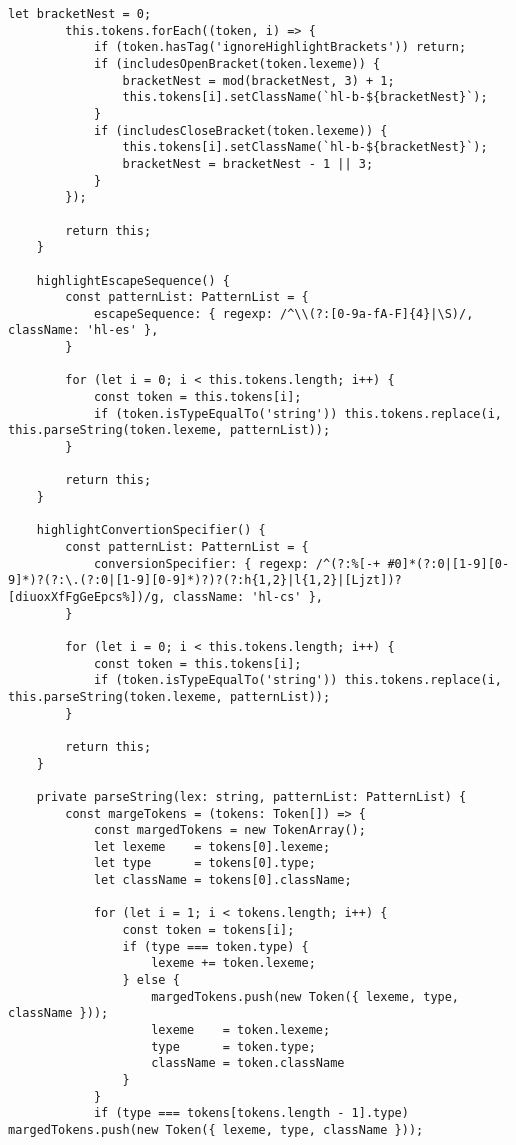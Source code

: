 \documentclass[autodetect-engine,dvi=dvipdfmx,ja=standard,
               a4j,11pt]{bxjsarticle}
\begin{document}
\begin{lstlisting}[caption={ハイライタ基底クラス({\tt base.ts})}, label={prog:base}]
        let bracketNest = 0;
        this.tokens.forEach((token, i) => {
            if (token.hasTag('ignoreHighlightBrackets')) return;
            if (includesOpenBracket(token.lexeme)) {
                bracketNest = mod(bracketNest, 3) + 1;
                this.tokens[i].setClassName(`hl-b-${bracketNest}`);
            }
            if (includesCloseBracket(token.lexeme)) {
                this.tokens[i].setClassName(`hl-b-${bracketNest}`);
                bracketNest = bracketNest - 1 || 3;
            }
        });

        return this;
    }

    highlightEscapeSequence() {
        const patternList: PatternList = {
            escapeSequence: { regexp: /^\\(?:[0-9a-fA-F]{4}|\S)/, className: 'hl-es' },
        }

        for (let i = 0; i < this.tokens.length; i++) {
            const token = this.tokens[i];
            if (token.isTypeEqualTo('string')) this.tokens.replace(i, this.parseString(token.lexeme, patternList));
        }

        return this;
    }

    highlightConvertionSpecifier() {
        const patternList: PatternList = {
            conversionSpecifier: { regexp: /^(?:%[-+ #0]*(?:0|[1-9][0-9]*)?(?:\.(?:0|[1-9][0-9]*)?)?(?:h{1,2}|l{1,2}|[Ljzt])?[diuoxXfFgGeEpcs%])/g, className: 'hl-cs' },
        }

        for (let i = 0; i < this.tokens.length; i++) {
            const token = this.tokens[i];
            if (token.isTypeEqualTo('string')) this.tokens.replace(i, this.parseString(token.lexeme, patternList));
        }

        return this;
    }

    private parseString(lex: string, patternList: PatternList) {
        const margeTokens = (tokens: Token[]) => {
            const margedTokens = new TokenArray();
            let lexeme    = tokens[0].lexeme;
            let type      = tokens[0].type;
            let className = tokens[0].className;

            for (let i = 1; i < tokens.length; i++) {
                const token = tokens[i];
                if (type === token.type) {
                    lexeme += token.lexeme;
                } else {
                    margedTokens.push(new Token({ lexeme, type, className }));
                    lexeme    = token.lexeme;
                    type      = token.type;
                    className = token.className
                }
            }
            if (type === tokens[tokens.length - 1].type) margedTokens.push(new Token({ lexeme, type, className }));


\end{lstlisting}
\end{document}
